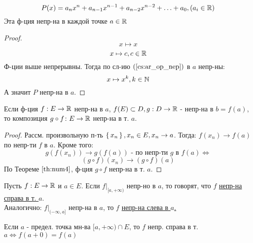\begin{example}
\[
P(x) = a_n x^{n} + a_{n - 1}x^{n - 1} + a_{n - 2}x^{n - 2} + \ldots + a_0, (a_i \in \mathbb{R})
\]
Эта ф-ция непр-на в каждой точке $a \in \mathbb{R}$
\end{example}
\begin{proof}
\[
x \mapsto x
\]
\[
x \mapsto c, c \in \mathbb{R}
\]
Ф-ции выше непрерывны. Тогда по сл-ию $(\ref{cs:ar_op_nep})$ в $a$ непр-ны:
\[
  x \mapsto x^{k}, k \in \mathbb{N}
\]
А значит $P$ непр-на в $a$.
\end{proof}
\begin{theorem}
  \label{th:nepr_comp}
Если ф-ция $f: E \rightarrow \mathbb{R}$ непр-на в $a$, $f(E) \subset D, g: D \rightarrow \mathbb{R}$ - непр-на в $b = f(a)$, то композиция $g \circ f \colon E \rightarrow \mathbb{R}$ непр-на в т. $a$.
\end{theorem}
\begin{proof}
  Рассм. произвольную п-ть $\set{x_n}, x_n \in E, x_n \rightarrow a$. Тогда: $f(x_n) \rightarrow f(a)$ по непр-ти $f$ в $a$. Кроме того:
  \[
  g(f(x_n)) \rightarrow g(f(a)) \text{ - по непр-ти $g$ в $f(a)$} \iff
  \]
  \[
    (g \circ f)(x_n) \rightarrow (g \circ f)(a)
  \]
  По Теореме $\ref{th:num4}$, ф-ция $g \circ f$ непр-на в т. $a$.
\end{proof}
\begin{definition}
Пусть $f: E \rightarrow \mathbb{R}$ и $a \in E$. Если $f|_{[a, +\infty)}$ непр-но в $a$, то говорят, что $f$ \underline{непр-на справа в т. $a$}. \\

Аналогично: $f|_{(-\infty, a]}$ непр-на в $a$, то $f$ \underline{непр-на слева в $a$.}
\end{definition}
\begin{note}
Если $a$ - предел. точка мн-ва $[a, +\infty) \cap E$, то $f$ непр. справа в т. $a \iff f(a + 0) = f(a)$
\end{note}
